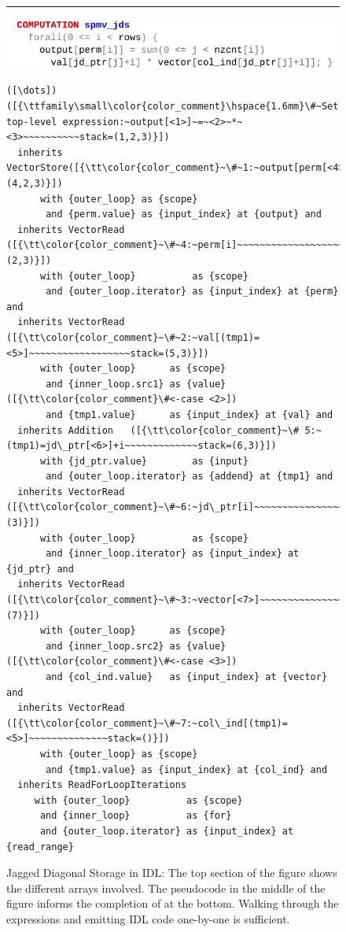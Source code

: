 \begin{figure}[p]
\vspace{0.8em}
\hrule
\vspace{0.3em}

\includegraphics[width=\linewidth]{figures/spmvjdswhat.pdf}
\vspace{-1.5em}
\begin{lstlisting}[language=IDL,firstnumber=7]
([\dots])([{\ttfamily\small\color{color_comment}\hspace{1.6mm}\#~Set top-level expression:~output[<1>]~=~<2>~*~<3>~~~~~~~~~~stack=(1,2,3)}])
  inherits VectorStore([{\tt\color{color_comment}~\#~1:~output[perm[<4>]]~~~~~~~~~~~~~~~~stack=(4,2,3)}])
      with {outer_loop} as {scope}
       and {perm.value} as {input_index} at {output} and
  inherits VectorRead ([{\tt\color{color_comment}~\#~4:~perm[i]~~~~~~~~~~~~~~~~~~~~~~~~~~stack=(2,3)}])
      with {outer_loop}          as {scope}
       and {outer_loop.iterator} as {input_index} at {perm} and
  inherits VectorRead ([{\tt\color{color_comment}~\#~2:~val[(tmp1)=<5>]~~~~~~~~~~~~~~~~~~stack=(5,3)}])
      with {outer_loop}      as {scope}
       and {inner_loop.src1} as {value}([{\tt\color{color_comment}\#<-case <2>])
       and {tmp1.value}      as {input_index} at {val} and
  inherits Addition   ([{\tt\color{color_comment}~\# 5:~(tmp1)=jd\_ptr[<6>]+i~~~~~~~~~~~~~stack=(6,3)}])
      with {jd_ptr.value}        as {input}
       and {outer_loop.iterator} as {addend} at {tmp1} and
  inherits VectorRead ([{\tt\color{color_comment}~\#~6:~jd\_ptr[i]~~~~~~~~~~~~~~~~~~~~~~~~stack=(3)}])
      with {outer_loop}          as {scope}
       and {inner_loop.iterator} as {input_index} at {jd_ptr} and
  inherits VectorRead ([{\tt\color{color_comment}~\#~3:~vector[<7>]~~~~~~~~~~~~~~~~~~~~~~stack=(7)}])
      with {outer_loop}      as {scope}
       and {inner_loop.src2} as {value}([{\tt\color{color_comment}\#<-case <3>])
       and {col_ind.value}   as {input_index} at {vector} and
  inherits VectorRead ([{\tt\color{color_comment}~\#~7:~col\_ind[(tmp1)=<5>]~~~~~~~~~~~~~~stack=()}])
      with {outer_loop} as {scope}
       and {tmp1.value} as {input_index} at {col_ind} and
  inherits ReadForLoopIterations
     with {outer_loop}          as {scope}
      and {inner_loop}          as {for}
      and {outer_loop.iterator} as {input_index} at {read_range}
\end{lstlisting}
\caption{Jagged Diagonal Storage in IDL:
         The top section of the figure shows the different arrays involved.
         The pseudocode in the middle of the figure informs the completion of
          at the bottom.
         Walking through the expressions and emitting IDL code one-by-one is
         sufficient.}
\label{jds_lilacwhat_fig}
\end{figure}

